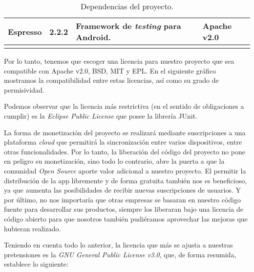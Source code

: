\begin{longtable}[]{@{}llll@{}}
\begin{minipage}[t]{0.18\columnwidth}
Espresso\strut
\end{minipage} & \begin{minipage}[t]{0.08\columnwidth}\raggedright\strut
2.2.2\strut
\end{minipage} & \begin{minipage}[t]{0.49\columnwidth}\raggedright\strut
Framework de \emph{testing} para Android.\strut
\end{minipage} & \begin{minipage}[t]{0.11\columnwidth}\raggedright\strut
Apache v2.0\strut
\end{minipage}\tabularnewline
\bottomrule
\caption{Dependencias del proyecto.}
\end{longtable}

Por lo tanto, tenemos que escoger una licencia para nuestro proyecto que
sea compatible con Apache v2.0, BSD, MIT y EPL. En el siguiente gráfico
mostramos la compatibilidad entre estas licencias, así como su grado de
permisividad.


Podemos observar que la licencia más restrictiva (en el sentido de
obligaciones a cumplir) es la \emph{Eclipse Public License} que posee la
librería JUnit.

La forma de monetización del proyecto se realizará mediante
suscripciones a una plataforma \emph{cloud} que permitirá la
sincronización entre varios dispositivos, entre otras funcionalidades.
Por lo tanto, la liberación del código del proyecto no pone en peligro
su monetización, sino todo lo contrario, abre la puerta a que la
comunidad \emph{Open Source} aporte valor adicional a nuestro proyecto.
El permitir la distribución de la app libremente y de forma gratuita
también nos es beneficioso, ya que aumenta las posibilidades de recibir
nuevas suscripciones de usuarios. Y por último, no nos importaría que
otras empresas se basaran en nuestro código fuente para desarrollar sus
productos, siempre los liberaran bajo una licencia de código abierto
para que nosotros también pudiéramos aprovechar las mejoras que hubieran
realizado.

Teniendo en cuenta todo lo anterior, la licencia que más se ajusta a
nuestras pretensiones es la \emph{GNU General Public License v3.0}, que,
de forma resumida, establece lo siguiente: \citep{license:gplv3}

